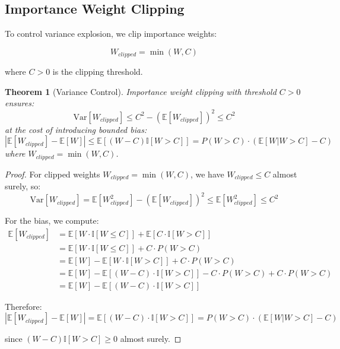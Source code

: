\documentclass[12pt,a4paper]{article}
\newtheorem{theorem}{Theorem}[section]
\begin{document}
\subsection{Importance Weight Clipping}

To control variance explosion, we clip importance weights:

$$W_{clipped} = \min(W, C)$$

where $C > 0$ is the clipping threshold.

\begin{theorem}[Variance Control]
\label{thm:variance_control}
Importance weight clipping with threshold $C > 0$ ensures:
$$\text{Var}[W_{clipped}] \leq C^2 - (\mathbb{E}[W_{clipped}])^2 \leq C^2$$
at the cost of introducing bounded bias:
$$|\mathbb{E}[W_{clipped}] - \mathbb{E}[W]| \leq \mathbb{E}[(W - C) \mathbb{I}[W > C]] = P(W > C) \cdot (\mathbb{E}[W | W > C] - C)$$
where $W_{clipped} = \min(W, C)$.
\end{theorem}

\begin{proof}
For clipped weights $W_{clipped} = \min(W, C)$, we have $W_{clipped} \leq C$ almost surely, so:
$$\text{Var}[W_{clipped}] = \mathbb{E}[W_{clipped}^2] - (\mathbb{E}[W_{clipped}])^2 \leq \mathbb{E}[W_{clipped}^2] \leq C^2$$

For the bias, we compute:
\begin{align}
\mathbb{E}[W_{clipped}] &= \mathbb{E}[W \cdot \mathbb{I}[W \leq C]] + \mathbb{E}[C \cdot \mathbb{I}[W > C]] \\
&= \mathbb{E}[W \cdot \mathbb{I}[W \leq C]] + C \cdot P(W > C) \\
&= \mathbb{E}[W] - \mathbb{E}[W \cdot \mathbb{I}[W > C]] + C \cdot P(W > C) \\
&= \mathbb{E}[W] - \mathbb{E}[(W - C) \cdot \mathbb{I}[W > C]] - C \cdot P(W > C) + C \cdot P(W > C) \\
&= \mathbb{E}[W] - \mathbb{E}[(W - C) \cdot \mathbb{I}[W > C]]
\end{align}

Therefore:
$$|\mathbb{E}[W_{clipped}] - \mathbb{E}[W]| = \mathbb{E}[(W - C) \cdot \mathbb{I}[W > C]] = P(W > C) \cdot (\mathbb{E}[W | W > C] - C)$$

since $(W - C) \mathbb{I}[W > C] \geq 0$ almost surely.
\end{proof}
\end{document}
